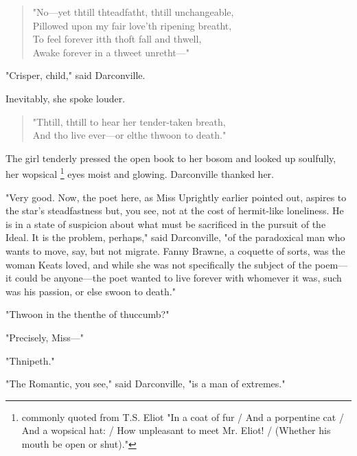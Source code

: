 \begin{verse}
        "No---yet thtill thteadfatht, thtill unchangeable, \\
        Pillowed upon my fair love'th ripening breatht,  \\
        To feel forever itth thoft fall and thwell,  \\
        Awake forever in a thweet unretht---"
\end{verse}
 
  "Crisper, child," said Darconville.

  Inevitably, she spoke louder.
 
\begin{verse}
        "Thtill, thtill to hear her tender-taken breath,  \\
        And tho live ever---or elthe thwoon to death."
\end{verse}
 
  The girl tenderly pressed the open book to her bosom and looked up soulfully,
her wopsical 
\footnote{ \textdbend commonly quoted from T.S. Eliot "In a coat of fur / And a
porpentine cat / And a wopsical hat: / How unpleasant to meet Mr. Eliot! /
(Whether his mouth be open or shut)."
}
eyes moist and glowing. Darconville thanked her.

  "Very good. Now, the poet here, as Miss Uprightly earlier pointed out, aspires
to the star's steadfastness but, you see, not at the cost of hermit-like
loneliness. He is in a state of suspicion about what must be sacrificed in the
pursuit of the Ideal. It is the problem, perhaps," said Darconville, "of the
paradoxical man who wants to move, say, but not migrate. Fanny Brawne, a
coquette 
of sorts, was the woman Keats loved, and while she was not specifically
the subject of the poem---it could be anyone---the poet wanted to live forever 
with whomever it was, such was his passion, or else swoon 
to death."

  "Thwoon in the thenthe of thuccumb?"

  "Precisely, Miss---"

  "Thnipeth."

  "The Romantic, you see," said Darconville, "is a man of extremes."

